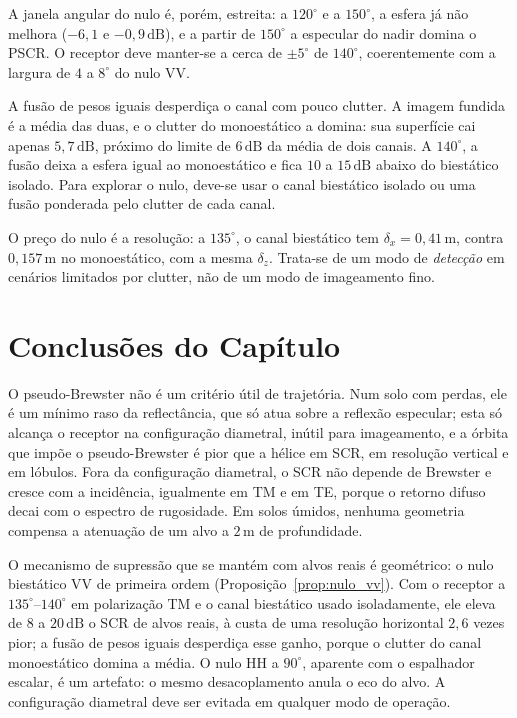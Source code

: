 \documentclass[12pt,a4paper,oneside]{book}
\theoremstyle{remark}
\newcommand{\dB}{\,\mathrm{dB}}
\theoremstyle{plain}
\theoremstyle{definition}
\begin{document}
A janela angular do nulo é, porém, estreita: a $120^\circ$ e a $150^\circ$, a esfera já não
melhora ($-6,1$ e $-0,9\dB$), e a partir de $150^\circ$ a especular do nadir domina o
PSCR. O receptor deve manter-se a cerca de $\pm5^\circ$ de $140^\circ$, coerentemente
com a largura de $4$ a $8^\circ$ do nulo VV.

A fusão de pesos iguais desperdiça o canal com pouco clutter. A imagem fundida é
a média das duas, e o clutter do monoestático a domina: sua superfície cai
apenas $5,7\dB$, próximo do limite de $6\dB$ da média de dois canais. A $140^\circ$,
a fusão deixa a esfera igual ao monoestático e fica $10$ a $15\dB$ abaixo do
biestático isolado. Para explorar o nulo, deve-se usar o canal biestático isolado
ou uma fusão ponderada pelo clutter de cada canal.

O preço do nulo é a resolução: a $135^\circ$, o canal biestático tem
$\delta_x=0,41\,$m, contra $0,157\,$m no monoestático, com a mesma $\delta_z$. Trata-se
de um modo de \emph{detecção} em cenários limitados por clutter, não de um modo de
imageamento fino.

\section{Conclusões do Capítulo}
\label{sec:sup_sintese}

O pseudo-Brewster não é um critério útil de trajetória. Num solo com perdas, ele é
um mínimo raso da reflectância, que só atua sobre a reflexão especular; esta só
alcança o receptor na configuração diametral, inútil para imageamento, e a órbita
que impõe o pseudo-Brewster é pior que a hélice em SCR, em resolução vertical e em
lóbulos. Fora da configuração diametral, o SCR não depende de Brewster e cresce com
a incidência, igualmente em TM e em TE, porque o retorno difuso decai com o
espectro de rugosidade. Em solos úmidos, nenhuma geometria compensa a atenuação de
um alvo a $2\,$m de profundidade.

O mecanismo de supressão que se mantém com alvos reais é geométrico: o nulo
biestático VV de primeira ordem (Proposição~\ref{prop:nulo_vv}). Com o receptor a
$135^\circ$--$140^\circ$ em polarização TM e o canal biestático usado isoladamente,
ele eleva de $8$ a $20\dB$ o SCR de alvos reais, à custa de uma resolução horizontal
$2,6$ vezes pior; a fusão de pesos iguais desperdiça esse ganho, porque o clutter do
canal monoestático domina a média. O nulo HH a $90^\circ$, aparente com o espalhador
escalar, é um artefato: o mesmo desacoplamento anula o eco do alvo. A configuração
diametral deve ser evitada em qualquer modo de operação.
\end{document}
